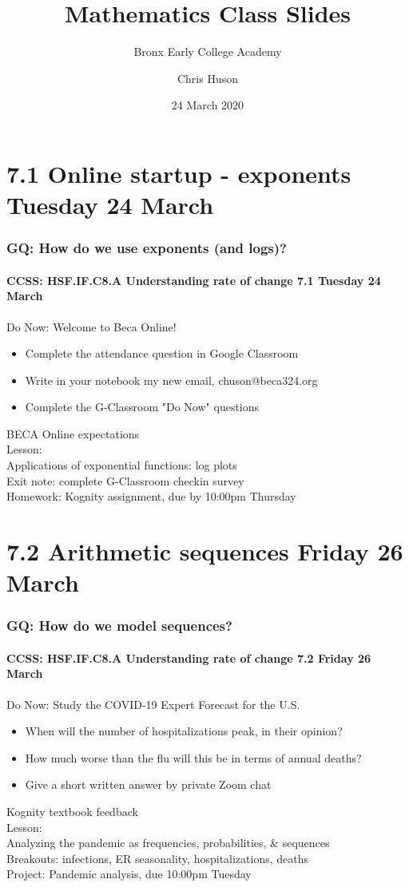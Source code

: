 \documentclass{beamer}
\title{Mathematics Class Slides}
\subtitle{Bronx Early College Academy}
\author{Chris Huson}
\date{24 March 2020}
\begin{document}
\frame{\titlepage}
\section[Outline]{}
\frame{\tableofcontents}

\section{7.1 Online startup - exponents \hfill Tuesday 24 March}
  \frame
  {
    \frametitle{GQ: How do we use exponents (and logs)?}
    \framesubtitle{CCSS: HSF.IF.C8.A Understanding rate of change \hfill \alert{7.1 Tuesday 24 March}}
    \begin{block}{Do Now: Welcome to Beca Online!}
      \begin{itemize}
        \item Complete the attendance question in Google Classroom
        \item Write in your notebook my new email, chuson@beca324.org
        \item Complete the G-Classroom "Do Now" questions
      \end{itemize}
  
      \end{block}
      BECA Online expectations \\[0.25cm]
      Lesson: \\
      Applications of exponential functions: log plots \\
      Exit note: complete G-Classroom checkin survey \\
      Homework: Kognity assignment, due by 10:00pm Thursday
      }

\section{7.2 Arithmetic sequences \hfill Friday 26 March}
\frame
{
  \frametitle{GQ: How do we model sequences?}
  \framesubtitle{CCSS: HSF.IF.C8.A Understanding rate of change \hfill \alert{7.2 Friday 26 March}}
  \begin{block}{Do Now: Study the COVID-19 Expert Forecast for the U.S.}
    \begin{itemize}
      \item When will the number of hospitalizations peak, in their opinion?
      \item How much worse than the flu will this be in terms of annual deaths?
      \item Give a short written answer by private Zoom chat
    \end{itemize}

    \end{block}
    Kognity textbook feedback \\[0.25cm]
    Lesson: \\
    Analyzing the pandemic as frequencies, probabilities, \& sequences \\
    Breakouts: infections, ER seasonality, hospitalizations, deaths \\
    Project: Pandemic analysis, due 10:00pm Tuesday
    }
\end{document}
